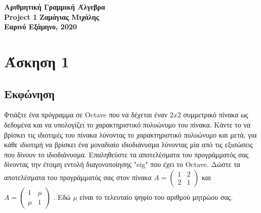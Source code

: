 \documentclass[a4paper,12pt]{article}
\begin{document}
\begin{titlepage}
	\begin{center}
		\vspace*{\fill}
		\huge{\textbf{Αριθμητική Γραμμική Άλγεβρα\\}}
		\vfill
		\huge{\textbf{Project 1}}
		\vspace*{\fill}
		\vfill
		\normalsize\textbf{Ζαμάγιας Μιχάλης\\}
		\small\textbf{Εαρινό Εξάμηνο, 2020\\}
		\vfill
	\end{center}
\end{titlepage}
\tableofcontents
\newpage
\section{Άσκηση 1}
\subsection{Εκφώνηση}
Φτιάξτε ένα πρόγραμμα σε Octave που να δέχεται έναν ${2x2}$ συμμετρικό πίνακα ως δεδομένα και να
υπολογίζει το χαρακτηριστικό πολυώνυμο του πίνακα. Κάντε το να βρίσκει τις ιδιοτιμές του πίνακα
λύνοντας το χαρακτηριστικό πολυώνυμο και μετά, για κάθε ιδιοτιμή να βρίσκει ένα μοναδιαίο ιδιοδιάνυσμα
λύνοντας μία από τις εξισώσεις που δίνουν το ιδιοδιάνυσμα. Επαληθεύστε τα αποτελέσματα του προγράμματός
σας δίνοντας την έτοιμη εντολή διαγονοποίησης "eig" που έχει το Octave. Δώστε τα αποτελέσματα του
προγράμματός σας στον πίνακα
$
	A=\begin{pmatrix}
		1 & 2 \\
		2 & 1
	\end{pmatrix}
$
και
$
	A=\begin{pmatrix}
		1   & \mu \\
		\mu & 1
	\end{pmatrix}
$
. Εδώ ${\mu}$ είναι το τελευταίο ψηφίο του αριθμού μητρώου σας.
\end{document}
